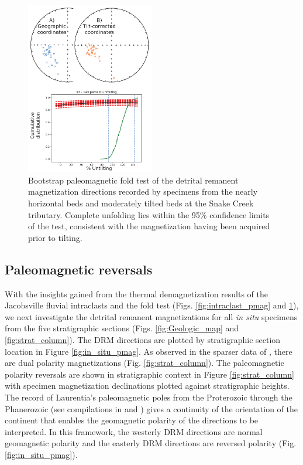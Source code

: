 \documentclass[draft]{agujournal2019}
\begin{document}
\begin{figure}
\centering
\includegraphics[width=0.5\textwidth]{SC1_fold_test.pdf}
\caption{Bootstrap paleomagnetic fold test \cite{Tauxe1994a} of the detrital remanent magnetization directions recorded by specimens from the nearly horizontal beds and moderately tilted beds at the Snake Creek tributary. Complete unfolding lies within the 95\% confidence limits of the test, consistent with the magnetization having been acquired prior to tilting.}
\label{fig:fold_test}
\end{figure}

\subsection*{Paleomagnetic reversals}

With the insights gained from the thermal demagnetization results of the Jacobsville fluvial intraclasts and the fold test (Figs. \ref{fig:intraclast_pmag} and \ref{fig:fold_test}), we next investigate the detrital remanent magnetizations for all \textit{in situ} specimens from the five stratigraphic sections (Figs. \ref{fig:Geologic_map} and \ref{fig:strat_column}). The DRM directions are plotted by stratigraphic section location in Figure \ref{fig:in_situ_pmag}. As observed in the sparser data of , there are dual polarity magnetizations (Fig. \ref{fig:strat_column}). The paleomagnetic polarity reversals are shown in stratigraphic context in Figure \ref{fig:strat_column} with specimen magnetization declinations plotted against stratigraphic heights. The record of Laurentia's paleomagnetic poles from the Proterozoic through the Phanerozoic (see compilations in  and ) gives a continuity of the orientation of the continent that enables the geomagnetic polarity of the directions to be interpreted. In this framework, the westerly DRM directions are normal geomagnetic polarity and the easterly DRM directions are reversed polarity (Fig. \ref{fig:in_situ_pmag}). 
\end{document}
